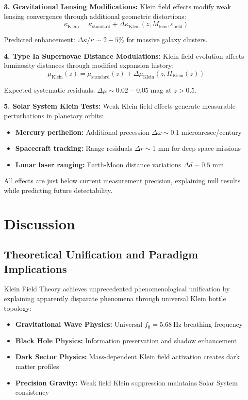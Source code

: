 \documentclass[12pt]{iopart}
\newcommand{\fzero}{f_0}
\begin{document}
\textbf{3. Gravitational Lensing Modifications:}
Klein field effects modify weak lensing convergence through additional geometric distortions:
\begin{equation}
\kappa_{\text{Klein}} = \kappa_{\text{standard}} + \Delta\kappa_{\text{Klein}}(z, M_{\text{lens}}, \varepsilon_{\text{field}})
\end{equation}

Predicted enhancement: $\Delta\kappa/\kappa \sim 2-5\%$ for massive galaxy clusters.

\textbf{4. Type Ia Supernovae Distance Modulations:}
Klein field evolution affects luminosity distances through modified expansion history:
\begin{equation}
\mu_{\text{Klein}}(z) = \mu_{\text{standard}}(z) + \Delta\mu_{\text{Klein}}(z, H_{\text{Klein}}(z))
\end{equation}

Expected systematic residuals: $\Delta\mu \sim 0.02-0.05$ mag at $z > 0.5$.

\textbf{5. Solar System Klein Tests:}
Weak Klein field effects generate measurable perturbations in planetary orbits:
\begin{itemize}
\item \textbf{Mercury perihelion:} Additional precession $\Delta\omega \sim 0.1$ microarcsec/century
\item \textbf{Spacecraft tracking:} Range residuals $\Delta r \sim 1$ mm for deep space missions
\item \textbf{Lunar laser ranging:} Earth-Moon distance variations $\Delta d \sim 0.5$ mm
\end{itemize}

All effects are just below current measurement precision, explaining null results while predicting future detectability.

\section{Discussion}

\subsection{Theoretical Unification and Paradigm Implications}

Klein Field Theory achieves unprecedented phenomenological unification by explaining apparently disparate phenomena through universal Klein bottle topology:

\begin{itemize}
\item \textbf{Gravitational Wave Physics:} Universal $\fzero = \SI{5.68}{\hertz}$ breathing frequency
\item \textbf{Black Hole Physics:} Information preservation and shadow enhancement
\item \textbf{Dark Sector Physics:} Mass-dependent Klein field activation creates dark matter profiles
\item \textbf{Precision Gravity:} Weak field Klein suppression maintains Solar System consistency
\end{itemize}
\end{document}

